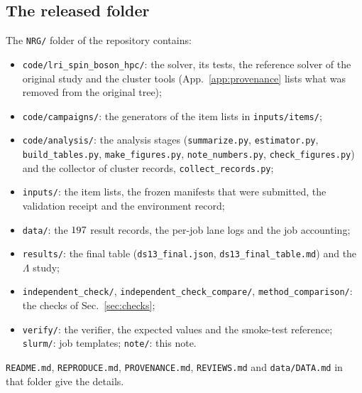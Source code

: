 \documentclass[10pt,a4paper]{article}
\newcommand{\code}[1]{\texttt{#1}}
\begin{document}
\subsection{The released folder}
The \code{NRG/} folder of the repository contains:
\begingroup\raggedright
\begin{itemize}
\item \code{code/lri\_spin\_boson\_hpc/}: the solver, its tests, the reference solver of the original study and the cluster tools
  (App.~\ref{app:provenance} lists what was removed from the original tree);
\item \code{code/campaigns/}: the generators of the item lists in \code{inputs/items/};
\item \code{code/analysis/}: the analysis stages (\code{summarize.py}, \code{estimator.py},
  \code{build\_tables.py}, \code{make\_figures.py}, \code{note\_numbers.py}, \code{check\_figures.py}) and the
  collector of cluster records, \code{collect\_records.py};
\item \code{inputs/}: the item lists, the frozen manifests that were submitted, the validation receipt and the environment record;
\item \code{data/}: the $197$ result records, the per-job lane logs and the job accounting;
\item \code{results/}: the final table (\code{ds13\_final.json}, \code{ds13\_final\_table.md}) and the $\Lambda$ study;
\item \code{independent\_check/}, \code{independent\_check\_compare/}, \code{method\_comparison/}: the checks of Sec.~\ref{sec:checks};
\item \code{verify/}: the verifier, the expected values and the smoke-test reference; \code{slurm/}: job templates; \code{note/}: this
  note.
\end{itemize}
\endgroup
\noindent\code{README.md}, \code{REPRODUCE.md}, \code{PROVENANCE.md}, \code{REVIEWS.md} and \code{data/DATA.md} in that folder give the details.
\end{document}
